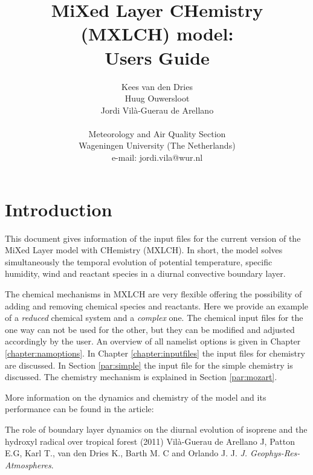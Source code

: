 \documentclass[twoside,11pt,fleqn,a4paper,english,openright]{report}
\begin{document}
 \begin{titlepage}
  \title{\textbf{MiXed Layer CHemistry (MXLCH) model:\\
		 Users Guide}}
  \author{Kees van den Dries\\
          Huug Ouwersloot\\
          Jordi Vil\`a-Guerau de Arellano\\
\\
Meteorology and Air Quality Section\\
Wageningen University (The Netherlands)
\\
e-mail: jordi.vila@wur.nl }
  \maketitle
 \end{titlepage}
\thispagestyle{empty}

\tableofcontents
{}
\chapter{Introduction}\label{chapter:introduction}

\setcounter{page}{1}
This document gives information of the input files
for the current version of the MiXed Layer model with CHemistry (MXLCH). 
In short, the model solves simultaneously the temporal evolution of potential
temperature, specific humidity, wind and reactant species in a diurnal
convective boundary layer.

The chemical mechanisms in MXLCH are very flexible offering the possibility of adding and
removing chemical species and reactants.
Here we provide an example of a {\it reduced} chemical system and a {\it complex} one.
The chemical input files for the one way can not be used for the other, but they can be modified
and adjusted accordingly by the user.
An overview of all namelist options is given in Chapter \ref{chapter:namoptions}. 
In Chapter \ref{chapter:inputfiles} the input files for chemistry are discussed. In Section \ref{par:simple} the input file for the simple chemistry is discussed.
The chemistry mechanism is explained in Section \ref{par:mozart}.

More information on the dynamics and chemistry of the model and its performance can be found in the article:

\vspace{0.5cm}

The role of boundary layer dynamics on the diurnal evolution of isoprene and the hydroxyl radical over tropical forest (2011)
Vil\`a-Guerau de Arellano J, Patton E.G, Karl T., van den Dries K., Barth M. C and Orlando J. J. {\it J. Geophys-Res-Atmospheres}.
\end{document}
